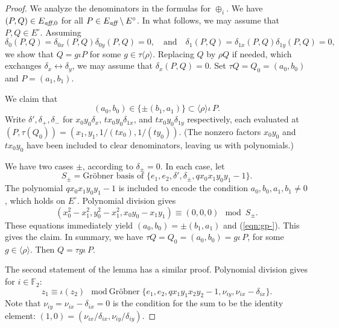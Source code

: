 \documentclass[12pt]{article}
\newcommand{\ring}[1]{\mathbb{#1}}
\newcommand{\op}[1]{\hbox{#1}}
\newcommand{\Eaff}{E_{\op{\scriptsize\it aff}}}
\newcommand{\Eaf}[1]{E_{\op{\scriptsize\it aff},{#1}}}
\newcommand{\Eoo}{E^{\circ}} %
\newcommand{\Go}{\langle\rho\rangle}
\newcommand{\ang}[1]{\langle{#1}\rangle}
\begin{document}
\begin{proof} 
We analyze the denominators in the formulas for $\oplus_i$.  
We have $(P,Q)\in\Eaf{0}$ for all $P\in \Eaff\setminus\Eoo$.
In what follows, we may assume that $P,Q\in \Eoo$.
  Assuming
  \[
  \delta_0(P,Q) = \delta_{0x}(P,Q)\delta_{0y}(P,Q)=0,\quad\text{and}\quad
  \delta_1(P,Q) = \delta_{1x}(P,Q)\delta_{1y}(P,Q)=0,
  \]
  we show that $Q = g \iota P$ for some $g\in \tau\ang{\rho}$.
  Replacing $Q$ by $\rho Q$ if needed, which exchanges
  $\delta_x\leftrightarrow \delta_y$, we may assume that
  $\delta_x(P,Q)=0$.  Set $\tau Q = Q_0 = (a_0,b_0)$ and
  $P=(a_1,b_1)$.  

We claim that
\begin{equation}\label{eqn:gp-}
(a_0,b_0) \in \{\pm (b_1,a_1)\} \subset \Go\iota\,P.
\end{equation}
Write $\delta',\delta_{+},\delta_{-}$ for $x_0 y_0\delta_x$,
$t x_0 y_0\delta_{1x}$, and $t x_0 y_0 \delta_{1y}$ respectively,
each evaluated at $(P,\tau(Q_0))=(x_1,y_1,1/(t x_0),1/(t y_0))$. 
(The nonzero factors $x_0y_0$
and $t x_0 y_0$ have been included to clear denominators, leaving us
with polynomials.)

We have two cases $\pm$, according to $\delta_{\pm}=0$.
In each case, let
\[
S_\pm = \text{Gr\"obner basis of } \{e_1,e_2, 
\delta',\delta_{\pm},q x_0 x_1 y_0 y_1 - 1\}.
\]
The polynomial $q x_0 x_1 y_0 y_1-1$ is included to encode the
condition $a_0,b_0,a_1,b_1\ne 0$, which holds on $\Eoo$.  Polynomial
division gives
\begin{equation}\label{eqn:dichot}
(x_0^2-x_1^2,y_0^2-x_1^2,x_0 y_0 - x_1 y_1) \equiv (0,0,0) \mod S_\pm.
\end{equation}
These equations immediately yield $(a_0,b_0) = \pm (b_1,a_1)$ and
(\ref{eqn:gp-}).  This gives the claim.
In summary, we have $\tau Q = Q_0 = (a_0,b_0) = g \iota\,P$, for some
$g\in \Go$.  Then $Q = \tau g \iota\,P$.

The second statement of the lemma has a similar proof.  Polynomial
division gives for $i\in \ring{F}_2$:
\[
z_1 \equiv \iota (z_2) \mod \text{Gr\"obner} 
\{ e_1,e_2,q x_1 y_1 x_2 y_2 -1,\nu_{i y},\nu_{i x}-\delta_{i x} \}.
\]
Note that $\nu_{i y}=\nu_{i x}-\delta_{i x}=0$ is the condition for
the sum to be the identity element: $(1,0)=(\nu_{ix}/\delta_{ix},\nu_{iy}/\delta_{iy})$.
\end{proof}
\end{document}
